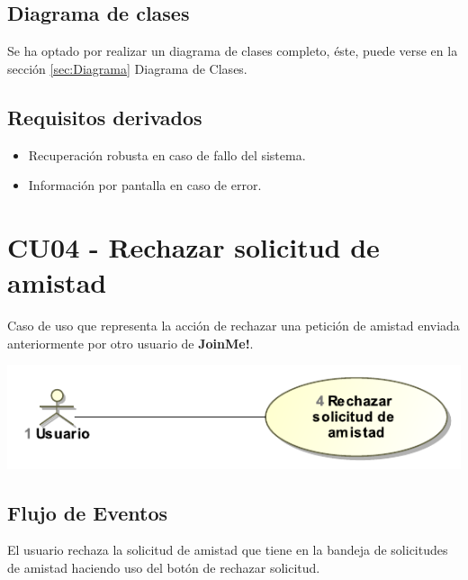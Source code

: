 \documentclass[12pt, a4paper, titlepage]{article}
\begin{document}
\subsection{Diagrama de clases}
Se ha optado por realizar un diagrama de clases completo, éste, puede verse en la sección \ref{sec:Diagrama} Diagrama de Clases.
\subsection{Requisitos derivados}
\begin{itemize}
	\item Recuperación robusta en caso de fallo del sistema.
	\item Información por pantalla en caso de error.
\end{itemize}

\section{CU04 - Rechazar solicitud de amistad}

Caso de uso que representa la acción de rechazar una petición de amistad enviada anteriormente por otro usuario de \textbf{JoinMe!}.

\begin{center}
	\includegraphics{Imagenes/RechazarSolicitudAmistadCU}
\end{center}
\subsection{Flujo de Eventos}

El usuario rechaza la solicitud de amistad que tiene en la bandeja de solicitudes de amistad haciendo uso del botón de rechazar solicitud.
\end{document}
